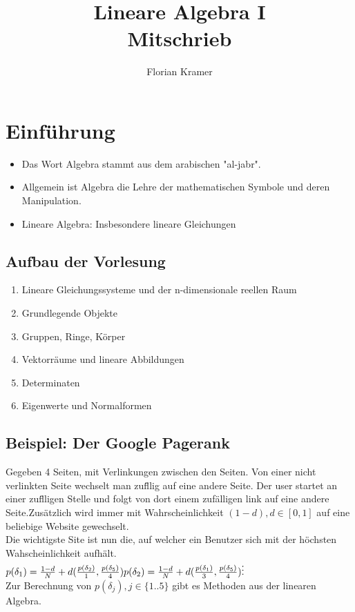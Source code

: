 \documentclass{scrartcl}
\title{Lineare Algebra I\\Mitschrieb}
\author{Florian Kramer}
\begin{document}
\maketitle
\tableofcontents
\pagebreak

\section{Einf\"uhrung}
\begin{itemize}
\item{Das Wort Algebra stammt aus dem arabischen "al-jabr".}
\item{Allgemein ist Algebra die Lehre der mathematischen Symbole und deren Manipulation.}
\item{Lineare Algebra: Insbesondere lineare Gleichungen}
\end{itemize}

\subsection{Aufbau der Vorlesung}
\begin{enumerate}
\item{Lineare Gleichungssysteme und der n-dimensionale reellen Raum}
\item{Grundlegende Objekte}
\item{Gruppen, Ringe, K\"orper}
\item{Vektorr\"aume und lineare Abbildungen}
\item{Determinaten}
\item{Eigenwerte und Normalformen}
\end{enumerate}

\subsection{Beispiel: Der Google Pagerank}
Gegeben 4 Seiten, mit Verlinkungen zwischen den Seiten. Von einer nicht  verlinkten Seite wechselt man zuf\"llig auf eine andere Seite. Der user startet an einer zuf\"lligen Stelle und folgt von dort einem zuf\"alligen link auf eine andere Seite.Zus\"atzlich wird immer mit Wahrscheinlichkeit \((1-d), d \in [0, 1]\) auf eine beliebige Website gewechselt.\\
Die wichtigste Site ist nun die, auf welcher ein Benutzer sich mit der h\"ochsten Wahscheinlichkeit aufh\"alt.\\
\(
p(\delta_1) = \frac{1-d}{N} + d(\frac{p(\delta_2)}{1}, \frac{p(\delta_5)}{4})\\
p(\delta_2) = \frac{1-d}{N} + d(\frac{p(\delta_1)}{3}, \frac{p(\delta_5)}{4})\\
\vdots
\)\\
Zur Berechnung von \(p(\delta_j), j \in \{1..5\}\) gibt es Methoden aus der linearen Algebra.
\end{document}
